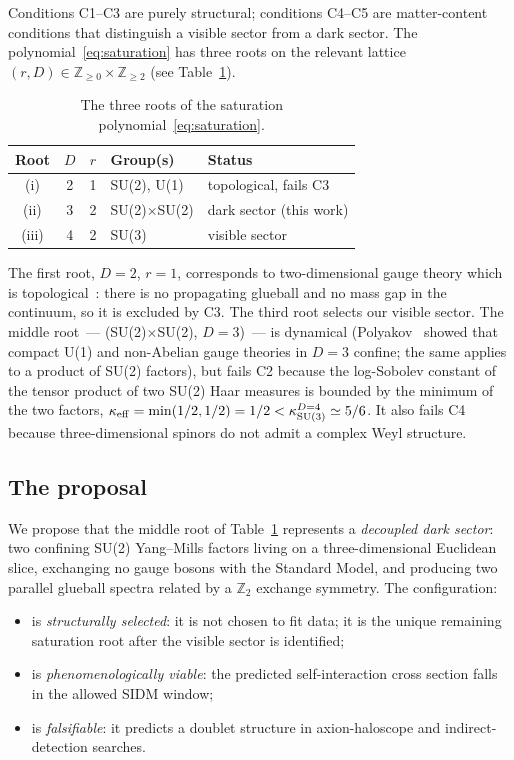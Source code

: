 \documentclass[aps,prd,twocolumn,nofootinbib,superscriptaddress,floatfix]{revtex4-2}
\begin{document}
Conditions C1--C3 are purely structural; conditions C4--C5 are matter-content conditions that distinguish a visible sector from a dark sector. The polynomial~\eqref{eq:saturation} has three roots on the relevant lattice $(r,D)\in\mathbb{Z}_{\geq 0}\times \mathbb{Z}_{\geq 2}$ (see Table~\ref{tab:roots}).

\begin{table}[t]
    \centering
    \begin{tabular}{cccll}
        \toprule
        Root & $D$ & $r$ & Group(s) & Status \\
        \midrule
        (i)   & 2 & 1 & SU(2), U(1)        & topological, fails C3 \\
        (ii)  & 3 & 2 & SU(2)$\times$SU(2) & dark sector (this work) \\
        (iii) & 4 & 2 & SU(3)              & visible sector \\
        \bottomrule
    \end{tabular}
    \caption{The three roots of the saturation polynomial~\eqref{eq:saturation}.}
    \label{tab:roots}
\end{table}

The first root, $D=2$, $r=1$, corresponds to two-dimensional gauge theory which is topological~\cite{Migdal1975,Witten1991}: there is no propagating glueball and no mass gap in the continuum, so it is excluded by C3. The third root selects our visible sector. The middle root~--- (SU(2)$\times$SU(2), $D=3$)~--- is dynamical (Polyakov~\cite{Polyakov1977} showed that compact U(1) and non-Abelian gauge theories in $D=3$ confine; the same applies to a product of SU(2) factors), but fails C2 because the log-Sobolev constant of the tensor product of two SU(2) Haar measures is bounded by the minimum of the two factors, $\kappa_{\rm eff}=\min(1/2,1/2)=1/2 < \kappa_{\rm SU(3)}^{D=4}\simeq 5/6$. It also fails C4 because three-dimensional spinors do not admit a complex Weyl structure.

\subsection{The proposal}

We propose that the middle root of Table~\ref{tab:roots} represents a \emph{decoupled dark sector}: two confining SU(2) Yang--Mills factors living on a three-dimensional Euclidean slice, exchanging no gauge bosons with the Standard Model, and producing two parallel glueball spectra related by a $\mathbb{Z}_2$ exchange symmetry. The configuration:
\begin{itemize}
    \item is \emph{structurally selected}: it is not chosen to fit data; it is the unique remaining saturation root after the visible sector is identified;
    \item is \emph{phenomenologically viable}: the predicted self-interaction cross section falls in the allowed SIDM window;
    \item is \emph{falsifiable}: it predicts a doublet structure in axion-haloscope and indirect-detection searches.
\end{itemize}
\end{document}
